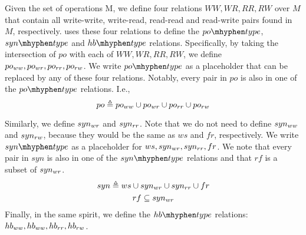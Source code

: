 Given the set of operations M, we define four relations $WW, WR, RR, RW$ over $M$ that contain all  write-write, write-read, read-read and read-write pairs found in $M$, respectively.
 uses these four relations to define the $\potype$, $\syntype$ and $\hbtype$ relations. Specifically,
by taking the intersection of $po$ with each of $WW, WR, RR, RW$, we define $po_{ww}, po_{wr},po_{rr}, po_{rw}$. We write $\potype$ as a placeholder that can be replaced by any of these four relations. Notably, every pair in $po$ is also in one of the $\potype$ relations. I.e.,
\begin{equation*}
    po \triangleq po_{ww} \cup po_{wr} \cup po_{rr} \cup po_{rw}
\end{equation*}

Similarly, we define $syn_{wr}$ and $syn_{rr}$. Note that we do not need to define $syn_{ww}$ and $syn_{rw}$, because they would be the same as $ws$ and $fr$, respectively.
We write $\syntype$ as a placeholder for $ws, syn_{wr}, syn_{rr}, fr$.
We note that every pair in $syn$ is also in one of the $\syntype$ relations and that $rf$ is a subset of $syn_{wr}$.
\begin{gather*}
    syn \triangleq ws \cup syn_{wr} \cup syn_{rr} \cup fr\\
    rf \subseteq syn_{wr}
\end{gather*}
Finally, in the same spirit, we define the $\hbtype$ relations: $hb_{ww}, hb_{ww}, hb_{rr},hb_{rw}$.







